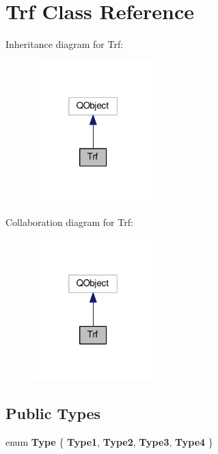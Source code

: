 \hypertarget{classTrf}{}\section{Trf Class Reference}
\label{classTrf}


Inheritance diagram for Trf\+:
\nopagebreak
\begin{figure}[H]
\begin{center}
\leavevmode
\includegraphics[width=133pt]{classTrf__inherit__graph}
\end{center}
\end{figure}


Collaboration diagram for Trf\+:
\nopagebreak
\begin{figure}[H]
\begin{center}
\leavevmode
\includegraphics[width=133pt]{classTrf__coll__graph}
\end{center}
\end{figure}
\subsection*{Public Types}
\begin{DoxyCompactItemize}
\item 
\hypertarget{classTrf_a95d5a31d33597372b88527b4072246fb}{}enum {\bfseries Type} \{ {\bfseries Type1}, 
{\bfseries Type2}, 
{\bfseries Type3}, 
{\bfseries Type4}
 \}\label{classTrf_a95d5a31d33597372b88527b4072246fb}

\end{DoxyCompactItemize}
